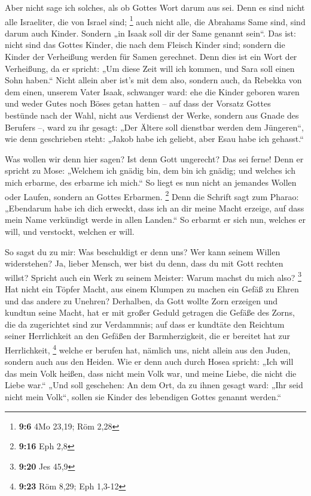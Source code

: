  Aber nicht sage ich solches, als ob Gottes Wort darum aus
sei. Denn es sind nicht alle Israeliter, die von Israel sind;
\footnote{\textbf{9:6} 4Mo 23,19; Röm 2,28}  auch nicht
alle, die Abrahams Same sind, sind darum auch Kinder. Sondern „in Isaak
soll dir der Same genannt sein``.  Das ist: nicht sind das
Gottes Kinder, die nach dem Fleisch Kinder sind; sondern die Kinder der
Verheißung werden für Samen gerechnet.  Denn dies ist ein
Wort der Verheißung, da er spricht: „Um diese Zeit will ich kommen, und
Sara soll einen Sohn haben.``  Nicht allein aber ist's
mit dem also, sondern auch, da Rebekka von dem einen, unserem Vater
Isaak, schwanger ward:  ehe die Kinder geboren waren und
weder Gutes noch Böses getan hatten -- auf dass der Vorsatz Gottes
bestünde nach der Wahl,  nicht aus Verdienst der Werke,
sondern aus Gnade des Berufers --, ward zu ihr gesagt: „Der Ältere soll
dienstbar werden dem Jüngeren``,  wie denn geschrieben
steht: „Jakob habe ich geliebt, aber Esau habe ich gehasst.``

 Was wollen wir denn hier sagen? Ist denn Gott ungerecht?
Das sei ferne!  Denn er spricht zu Mose: „Welchem ich
gnädig bin, dem bin ich gnädig; und welches ich mich erbarme, des
erbarme ich mich.``  So liegt es nun nicht an jemandes
Wollen oder Laufen, sondern an Gottes Erbarmen. \footnote{\textbf{9:16}
  Eph 2,8}  Denn die Schrift sagt zum Pharao: „Ebendarum
habe ich dich erweckt, dass ich an dir meine Macht erzeige, auf dass
mein Name verkündigt werde in allen Landen.``  So erbarmt
er sich nun, welches er will, und verstockt, welchen er will.

 So sagst du zu mir: Was beschuldigt er denn uns? Wer
kann seinem Willen widerstehen?  Ja, lieber Mensch, wer
bist du denn, dass du mit Gott rechten willst? Spricht auch ein Werk zu
seinem Meister: Warum machst du mich also? \footnote{\textbf{9:20} Jes
  45,9}  Hat nicht ein Töpfer Macht, aus einem Klumpen zu
machen ein Gefäß zu Ehren und das andere zu Unehren? 
Derhalben, da Gott wollte Zorn erzeigen und kundtun seine Macht, hat er
mit großer Geduld getragen die Gefäße des Zorns, die da zugerichtet sind
zur Verdammnis;  auf dass er kundtäte den Reichtum seiner
Herrlichkeit an den Gefäßen der Barmherzigkeit, die er bereitet hat zur
Herrlichkeit, \footnote{\textbf{9:23} Röm 8,29; Eph 1,3-12}
 welche er berufen hat, nämlich uns, nicht allein aus den
Juden, sondern auch aus den Heiden.  Wie er denn auch
durch Hosea spricht: „Ich will das mein Volk heißen, dass nicht mein
Volk war, und meine Liebe, die nicht die Liebe war.`` 
„Und soll geschehen: An dem Ort, da zu ihnen gesagt ward: „Ihr seid
nicht mein Volk``, sollen sie Kinder des lebendigen Gottes genannt
werden.``

